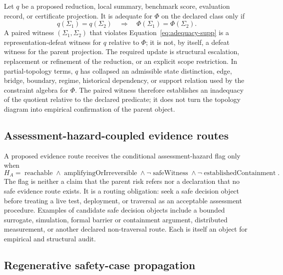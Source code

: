 \documentclass[10pt]{article}
\begin{document}
Let $q$ be a proposed reduction, local summary, benchmark score, evaluation record, or certificate projection. It is adequate for $\Phi$ on the declared class only if
\begin{equation}
q(\Sigma_1)=q(\Sigma_2)\quad\Longrightarrow\quad \Phi(\Sigma_1)=\Phi(\Sigma_2).
\label{eq:adequacy-supp}
\end{equation}
A paired witness $(\Sigma_1,\Sigma_2)$ that violates Equation~\eqref{eq:adequacy-supp} is a representation-defeat witness for $q$ relative to $\Phi$; it is not, by itself, a defeat witness for the parent projection. The required update is structural escalation, replacement or refinement of the reduction, or an explicit scope restriction.
 In partial-topology terms, $q$ has collapsed an admissible state distinction, edge, bridge, boundary, regime, historical dependency, or support relation used by the constraint algebra for $\Phi$. The paired witness therefore establishes an inadequacy of the quotient relative to the declared predicate; it does not turn the topology diagram into empirical confirmation of the parent object.

\subsection{Assessment-hazard-coupled evidence routes}

A proposed evidence route receives the conditional assessment-hazard flag only when
\begin{equation}
H_A=\operatorname{reachable}\wedge\operatorname{amplifyingOrIrreversible}\wedge\neg\operatorname{safeWitness}\wedge\neg\operatorname{establishedContainment}.
\label{eq:hazard-coupling-supp}
\end{equation}
The flag is neither a claim that the parent risk refers nor a declaration that no safe evidence route exists. It is a routing obligation: seek a safe decision object before treating a live test, deployment, or traversal as an acceptable assessment procedure. Examples of candidate safe decision objects include a bounded surrogate, simulation, formal barrier or containment argument, distributed measurement, or another declared non-traversal route. Each is itself an object for empirical and structural audit.

\subsection{Regenerative safety-case propagation}
\end{document}
